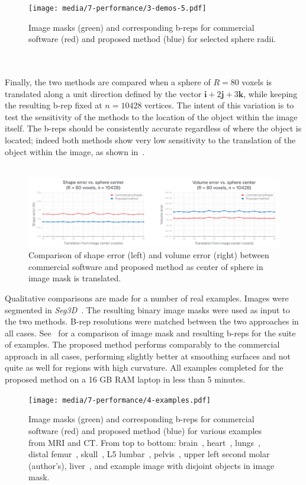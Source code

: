 \begin{figure}[ht!]
	\centering
	\texttt{[image: media/7-performance/3-demos-5.pdf]}
	\caption{Image masks (green) and corresponding b-reps for commercial software (red) and proposed method (blue) for selected sphere radii.}
	\label{fig:demos2}
\end{figure} \\ \\ 
%
Finally, the two methods are compared when a sphere of $R = 80$ voxels is translated along a unit direction defined by the vector $\bm{i}  + 2\bm{j} + 3\bm{k}$, while keeping the resulting b-rep fixed at $n = 10428$ vertices. The intent of this variation is to test the sensitivity of the methods to the location of the object within the image itself. The b-reps should be consistently accurate regardless of where the object is located; indeed both methods show very low sensitivity to the translation of the object within the image, as shown in~. \\ \\
\begin{figure}[ht!]
	\centering
	\includegraphics[scale=0.25]{media/7-performance/2-graph-3.pdf}
	\caption{Comparison of shape error (left) and volume error (right) between commercial software and proposed method as center of sphere in image mask is translated.}
	\label{fig:graph3}
\end{figure}
%
Qualitative comparisons are made for a number of real examples. Images were segmented in \textit{Seg3D}~\cite{Seg3D}. The resulting binary image masks were used as input to the two methods. B-rep resolutions were matched between the two approaches in all cases. See~ for a comparison of image mask and resulting b-reps for the suite of examples. The proposed method performs comparably to the commercial approach in all cases, performing slightly better at smoothing surfaces and not quite as well for regions with high curvature. All examples completed for the proposed method on a 16 GB RAM laptop in less than 5 minutes.
\begin{figure}[ht!]
	\centering
	\texttt{[image: media/7-performance/4-examples.pdf]}
	\caption{Image masks (green) and corresponding b-reps for commercial software (red) and proposed method (blue) for various examples from MRI and CT. From top to bottom: brain~\cite{marcus_2007}, heart~\cite{winslow_2012}, lungs~\cite{rikxoort_2009}, distal femur~\cite{epperson_2013}, skull~\cite{clark_2013}, L5 lumbar~\cite{yao_2016}, pelvis~\cite{clark_2013}, upper left second molar (author's), liver~\cite{bilic_2019}, and example image with disjoint objects in image mask.}
	\label{fig:example-meshes}
\end{figure}